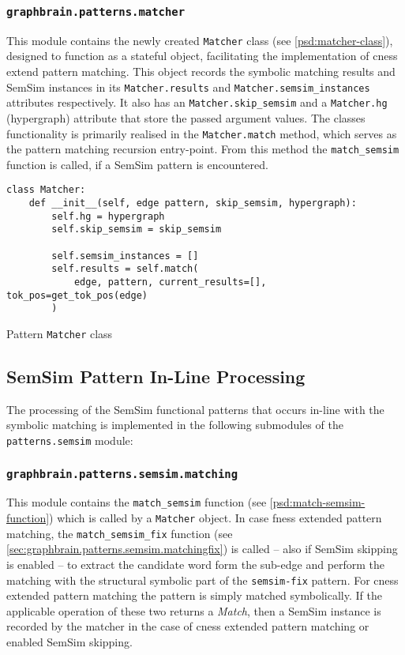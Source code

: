 \documentclass[11pt]{scrreprt}
\begin{document}
\subsubsection{\texttt{graphbrain.patterns.matcher}}
\label{sec:graphbrain.patterns.matcher}
This module contains the newly created \texttt{Matcher} class (see \cref{psd:matcher-class}), designed to function as a stateful object, facilitating the implementation of \gls{cness} extend pattern matching. This object records the symbolic matching results and SemSim instances in its \texttt{Matcher.results} and \texttt{Matcher.semsim\_instances} attributes respectively. It also has an \texttt{Matcher.skip\_semsim} and a \texttt{Matcher.hg} (hypergraph) attribute that store the passed argument values. The classes functionality is primarily realised in the \texttt{Matcher.match} method, which serves as the pattern matching recursion entry-point. From this method the \texttt{match\_semsim} function is called, if a SemSim pattern is encountered.


\begin{pseudo}
\begin{lstlisting}
class Matcher:
    def __init__(self, edge pattern, skip_semsim, hypergraph):
        self.hg = hypergraph
        self.skip_semsim = skip_semsim

        self.semsim_instances = []
        self.results = self.match(
            edge, pattern, current_results=[], tok_pos=get_tok_pos(edge)
        )
\end{lstlisting}
\caption{Pattern \texttt{Matcher} class}
\label{psd:matcher-class}
\end{pseudo}


\subsection{SemSim Pattern In-Line Processing}
The processing of the SemSim functional patterns that occurs in-line with the symbolic matching is implemented in the following submodules of the \texttt{patterns.semsim} module:


\subsubsection{\texttt{graphbrain.patterns.semsim.matching}}
This module contains the \texttt{match\_semsim} function (see \cref{psd:match-semsim-function}) which is called by a \texttt{Matcher} object. In case \gls{fness} extended pattern matching, the \texttt{match\_semsim\_fix} function (see \cref{sec:graphbrain.patterns.semsim.matchingfix}) is called -- also if SemSim skipping is enabled -- to extract the candidate word form the sub-edge and perform the matching with the structural symbolic part of the \texttt{semsim-fix} pattern. For \gls{cness} extended pattern matching the pattern is simply matched symbolically. If the applicable operation of these two returns a \textit{Match}, then a SemSim instance is recorded by the matcher in the case of \gls{cness} extended pattern matching or enabled SemSim skipping.
\end{document}
